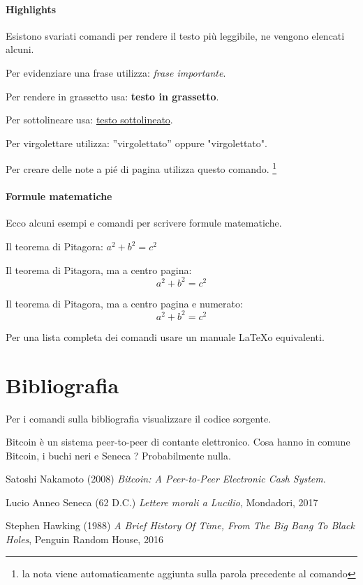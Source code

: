 \documentclass{article}
\begin{document}
\paragraph{Highlights} Esistono svariati comandi per rendere il testo più leggibile, ne vengono elencati alcuni.

Per evidenziare una frase utilizza: \emph{frase importante}.

Per rendere in grassetto usa: \textbf{testo in grassetto}.

Per sottolineare usa: \underline{testo sottolineato}.

Per virgolettare utilizza: ''virgolettato'' oppure "virgolettato".

Per creare delle note a pié di pagina utilizza questo comando. \footnote{la nota viene automaticamente aggiunta sulla parola precedente al comando}

\paragraph{Formule matematiche} Ecco alcuni esempi e comandi per scrivere formule matematiche.

Il teorema di Pitagora: $a^2 + b^2 = c^2$

Il teorema di Pitagora, ma a centro pagina: \[a^2 + b^2 = c^2\]

Il teorema di Pitagora, ma a centro pagina e numerato: 
\begin{equation}
    a^2 + b^2 = c^2
\end{equation}

Per una lista completa dei comandi usare un manuale \LaTeX o equivalenti.


\section{Bibliografia} Per i comandi sulla bibliografia visualizzare il codice sorgente.

Bitcoin \cite{satoshi08} è un sistema peer-to-peer di contante elettronico. Cosa hanno in comune Bitcoin, i buchi neri \cite{hawking} e Seneca \cite{seneca}? Probabilmente nulla.


\begin{thebibliography}{99}  %

Satoshi Nakamoto (2008) \emph{Bitcoin: A Peer-to-Peer Electronic Cash System}.  %

Lucio Anneo Seneca (62 D.C.) \emph{Lettere morali a Lucilio}, Mondadori, 2017

Stephen Hawking (1988) \emph{A Brief History Of Time, From The Big Bang To Black Holes}, Penguin Random House, 2016

\end{thebibliography} %
\end{document}
